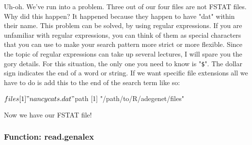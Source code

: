 \documentclass[letterpaper]{article}
\begin{document}
Uh-oh. We've run into a problem. Three out of our four files are not FSTAT files. Why did this happen? It happened because they happen to have "dat" within their name. This problem can be solved, by using regular expressions. If you are unfamiliar with regular expressions, you can think of them as special characters that you can use to make your search pattern more strict or more flexible. Since the topic of regular expressions can take up several lectures, I will spare you the gory details. For this situation, the only one you need to know is "\texttt{\$}". The dollar sign indicates the end of a word or string. If we want specific file extensions all we have to do is add this to the end of the search term like so:
\begin{Schunk}
\end{Schunk}
\begin{Schunk}
\begin{Soutput}
$files
[1] "nancycats.dat"

$path
[1] "/path/to/R/adegenet/files"
\end{Soutput}
\end{Schunk}
Now we have our FSTAT file!
\subsubsection{Function: read.genalex}
\end{document}
